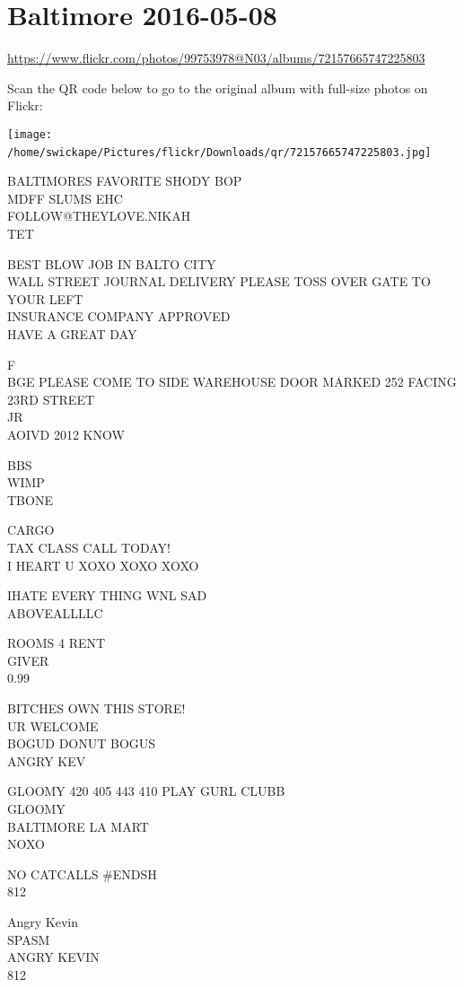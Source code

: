 \documentclass[10pt,letterpaper]{article}
\begin{document}
\section*{Baltimore 2016-05-08}

\url{https://www.flickr.com/photos/99753978@N03/albums/72157665747225803}

Scan the QR code below to go to the original album with full-size photos on Flickr:

\texttt{[image: /home/swickape/Pictures/flickr/Downloads/qr/72157665747225803.jpg]}
\

BALTIMORES FAVORITE SHODY BOP\\
MDFF SLUMS EHC\\
FOLLOW@THEYLOVE.NIKAH\\
TET

BEST BLOW JOB IN BALTO CITY\\
WALL STREET JOURNAL DELIVERY PLEASE TOSS OVER GATE TO YOUR LEFT\\
INSURANCE COMPANY APPROVED\\
HAVE A GREAT DAY

F\\
BGE PLEASE COME TO SIDE WAREHOUSE DOOR MARKED 252 FACING 23RD STREET\\
JR\\
AOIVD 2012 KNOW

BBS\\
WIMP\\
TBONE

CARGO\\
TAX CLASS CALL TODAY!\\
I HEART U XOXO XOXO XOXO

IHATE EVERY THING WNL SAD\\
ABOVEALLLLC

ROOMS 4 RENT\\
GIVER\\
0.99

BITCHES OWN THIS STORE!\\
UR WELCOME\\
BOGUD DONUT BOGUS\\
ANGRY KEV

GLOOMY 420 405 443 410 PLAY GURL CLUBB\\
GLOOMY\\
BALTIMORE LA MART\\
NOXO

NO CATCALLS \#ENDSH\\
812

Angry Kevin\\
SPASM\\
ANGRY KEVIN\\
812
\end{document}
